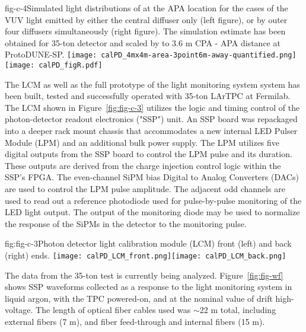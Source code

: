 %
\begin{cdrfigure}{fig-c-4}{Simulated light distributions of at the APA location for the cases of the VUV light emitted by either the central diffuser only (left figure), or by outer four diffusers simultaneously (right figure).
The simulation estimate has been obtained for 35-ton detector and scaled by to 3.6 m CPA - APA distance at ProtoDUNE-SP.}
\texttt{[image: calPD\_4mx4m-area-3point6m-away-quantified.png]}
\texttt{[image: calPD\_figR.pdf]}
\end{cdrfigure}
%

The LCM as well as the full prototype of the light monitoring system system has been built, tested and successfully operated with 35-ton LArTPC at Fermilab. The LCM shown in Figure~\ref{fig:fig-c-3}
utilizes the logic and timing control of the photon-detector readout electronics ("SSP") unit.  
An SSP board was repackaged into a deeper rack mount chassis that accommodates a new internal 
LED Pulser Module (LPM) and an additional bulk power supply. The LPM utilizes five digital outputs from the SSP board to control the LPM pulse and its duration.  
These outputs are derived from the charge injection control logic within the SSP's FPGA.  
The even-channel SiPM bias Digital to Analog Converters (DACs)
are used to control the LPM pulse amplitude.  
The adjacent odd channels are used to read out a reference photodiode used for pulse-by-pulse monitoring of the LED light output.  
The output of the monitoring diode may be used to normalize 
the response of the SiPMs in the detector to the monitoring pulse.

%
 \begin{cdrfigure}[]{fig:fig-c-3}{Photon detector light calibration module (LCM) front (left) and back (right) ends.}
\texttt{[image: calPD\_LCM\_front.png]}\texttt{[image: calPD\_LCM\_back.png]}
\end{cdrfigure}


The data from the 35-ton test is currently being analyzed. %
Figure~\ref{fig:fig-wf} shows SSP waveforms collected as a response to the light  monitoring system %
in liquid argon, with the TPC powered-on, and at the nominal value of drift high-voltage.  
The length of optical fiber cables used %
was $\sim$22 m total, including external fibers (7 m), and fiber feed-through and internal fibers (15 m).

